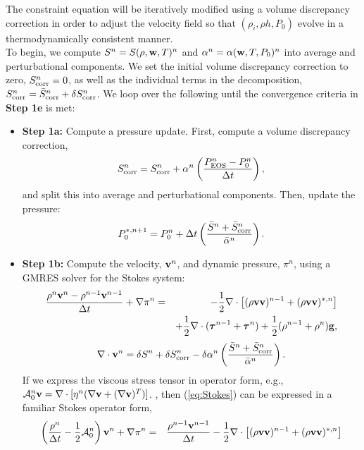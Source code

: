 \documentclass[final]{siamltex}
\def\gb {{\bf g}}
\def\vb {{\bf v}}
\def\wb {{\bf w}}
\def\taub   {\boldsymbol{\tau}}
\def\half   {\frac{1}{2}}
\begin{document}
The constraint equation will be iteratively modified using a volume discrepancy
correction in order to adjust the velocity field
so that $(\rho_i,\rho h,P_0)$ evolve in a thermodynamically consistent manner.\\

To begin, we compute $S^n = S(\rho,\wb,T)^n$ and $\alpha^n = \alpha(\wb,T,P_0)^n$
into average and perturbational components.
We set the initial volume discrepancy correction to zero, 
$S_{\rm corr}^n = 0$, as well as the individual terms in the decomposition,
$S_{\rm corr}^n = \bar{S}_{\rm corr}^n + \delta S_{\rm corr}^n$.
We loop over the following until the convergence criteria in {\bf Step 1e} is met:\\
\begin{itemize}
\item {\bf Step 1a:} Compute a pressure update.  First,
compute a volume discrepancy correction,
\begin{equation}
S_{\rm corr}^n = S_{\rm corr}^n + \alpha^{n}\left(\frac{P_{\rm EOS}^n - P_0^n}{\Delta t}\right),
\end{equation}
and split this into average and perturbational components.  Then, update the pressure:
\begin{equation}
P_0^{*,n+1} = P_0^n + \Delta t\left(\frac{\bar{S}^n + \bar{S}_{\rm corr}^n}{\bar{\alpha}^n}\right).
\end{equation}
\item {\bf Step 1b:} Compute the velocity, $\vb^n$, and dynamic pressure, $\pi^n$,
using a GMRES solver for the Stokes system:
\begin{eqnarray}
\frac{\rho^n\vb^n - \rho^{n-1}\vb^{n-1}}{\Delta t} + \nabla\pi^n &=& -\half\nabla\cdot\left[(\rho\vb\vb)^{n-1} + (\rho\vb\vb)^{*,n}\right]\nonumber\\
&& + \frac{1}{2}\nabla\cdot(\taub^{n-1} + \taub^n) + \frac{1}{2}(\rho^{n-1} + \rho^n)\gb,\label{eq:Stokes}
\end{eqnarray}
\begin{equation}
\nabla\cdot\vb^n = \delta S^n + \delta S_{\rm corr}^n - \delta\alpha^n\left(\frac{\bar{S}^n + \bar{S}_{\rm corr}^n}{\bar{\alpha}^n}\right).
\end{equation}
If we express the viscous stress tensor in operator form, e.g., 
$\mathcal{A}_0^n\vb = \nabla\cdot[\eta^n(\nabla\vb + (\nabla\vb)^T)]$. , then (\ref{eq:Stokes}) can be 
expressed in a familiar Stokes operator form,
\begin{eqnarray}
\left(\frac{\rho^n}{\Delta t} - \half\mathcal{A}_0^n\right)\vb^n + \nabla\pi^n &=& \frac{\rho^{n-1}\vb^{n-1}}{\Delta t} - \half\nabla\cdot\left[(\rho\vb\vb)^{n-1} + (\rho\vb\vb)^{*,n}\right]\nonumber\\

\end{eqnarray}
\end{itemize}
\end{document}

